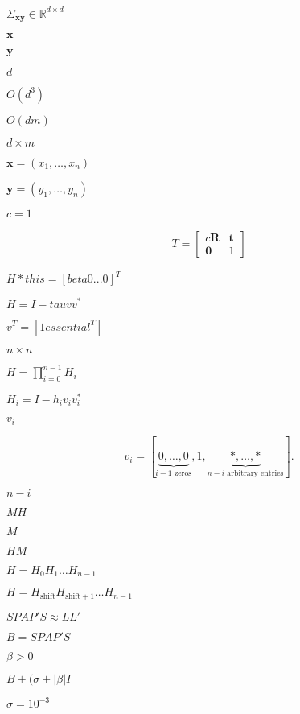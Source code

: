 \documentclass{article}
\begin{document}
$ \Sigma_{\mathbf{x}\mathbf{y}} \in \mathbb{R}^{d \times d} $
\pagebreak

$ \mathbf{x} $
\pagebreak

$ \mathbf{y} $
\pagebreak

$d$
\pagebreak

$O(d^3)$
\pagebreak

$O(dm)$
\pagebreak

$d \times m$
\pagebreak

$ \mathbf{x} = \left( x_1, \hdots, x_n \right) $
\pagebreak

$ \mathbf{y} = \left( y_1, \hdots, y_n \right) $
\pagebreak

$ c=1 $
\pagebreak

\begin{align*}
  T = \begin{bmatrix} c\mathbf{R} & \mathbf{t} \\ \mathbf{0} & 1 \end{bmatrix}
\end{align*}
\pagebreak

$ H *this = [ beta 0 ... 0]^T $
\pagebreak

$ H = I - tau v v^*$
\pagebreak

$ v^T = [1 essential^T] $
\pagebreak

$ n \times n $
\pagebreak

$ H = \prod_{i=0}^{n-1} H_i $
\pagebreak

$ H_i = I - h_i v_i
v_i^* $
\pagebreak

$
v_i $
\pagebreak

\[
v_i = [\underbrace{0, \ldots, 0}_{i-1\mbox{ zeros}}, 1, \underbrace{*, \ldots,*}_{n-i\mbox{ arbitrary entries}} ].
\]
\pagebreak

$ n-i $
\pagebreak

$ MH $
\pagebreak

$ M $
\pagebreak

$ HM $
\pagebreak

$ H = H_0 H_1 \ldots H_{n-1} $
\pagebreak

$ H = H_{\mathrm{shift}}
H_{\mathrm{shift}+1} \ldots H_{n-1} $
\pagebreak

$ S P A P' S \approx L L' $
\pagebreak

$ B = S P A P' S $
\pagebreak

$ \beta > 0 $
\pagebreak

$ B + (\sigma+|\beta| I $
\pagebreak

$ \sigma = 10^{-3} $
\pagebreak
\end{document}
